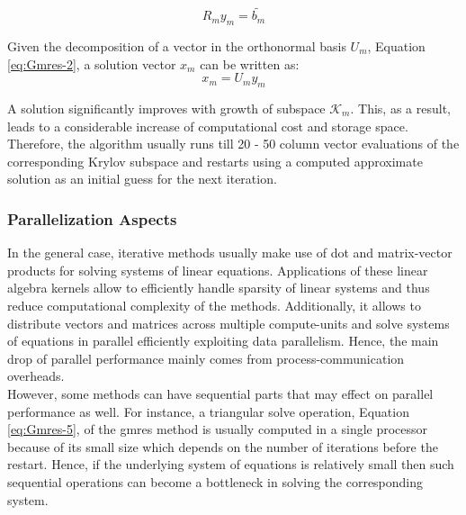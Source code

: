 \begin{equation} \label{eq:Gmres-5}
	R_m y_{m} = \tilde{b_m}
\end{equation}

Given the decomposition of a vector in  the orthonormal basis $U_{m}$, Equation \ref{eq:Gmres-2}, a solution vector $x_{m}$ can be written as:\\

\begin{equation} \label{eq:Gmres-6}
	x_m = U_m y_{m}  
\end{equation}


A solution significantly improves with growth of subspace $\mathcal{K}_{m}$. This, as a result, leads to a considerable increase of computational cost and storage space. Therefore, the algorithm usually runs till 20 - 50 column vector evaluations of the corresponding Krylov subspace and restarts using a computed approximate solution as an initial guess for the next iteration.\\


\subsubsection{Parallelization Aspects}
\label{subseq:iterative-parallel-aspects}


In the general case, iterative methods usually make use of dot and matrix-vector products for solving systems of linear equations. Applications of these linear algebra kernels allow to efficiently handle sparsity of linear systems and thus reduce computational complexity of the methods. Additionally, it allows to distribute vectors and matrices across multiple compute-units and solve systems of equations in parallel efficiently exploiting data parallelism. Hence, the main drop of parallel performance mainly comes from process-communication overheads.\\


However, some methods can have sequential parts that may effect on parallel performance as well. For instance, a triangular solve operation,  Equation \ref{eq:Gmres-5}, of the \acrshort{gmres} method is usually computed in a single processor because of its small size which depends on the number of iterations before the restart. Hence, if the underlying system of equations is relatively small then such sequential operations can become a bottleneck in solving the corresponding system.\\





